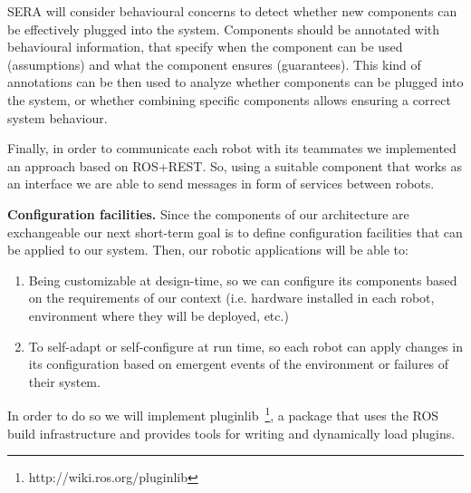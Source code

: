 SERA will consider behavioural concerns to detect whether new components can be effectively plugged into the system. 
Components should be annotated with behavioural information, that specify when the component can be used (assumptions) and what the component ensures (guarantees). 
This kind of annotations can be then used to analyze whether components can be plugged into the system, or whether combining specific components allows ensuring a correct system behaviour. 

Finally, in order to communicate each robot with its teammates we implemented an approach based on ROS+REST.
So, using a suitable component that works as an interface we are able to send messages in form of services between robots.

\textbf{Configuration facilities.}
Since the components of our architecture are exchangeable our next short-term goal is to define configuration facilities that can be applied to our system. %
Then, our robotic applications will be able to:

\begin{enumerate}
\item Being customizable at design-time, so we can configure its components based on the requirements of our context (i.e. hardware installed in each robot, environment where they will be deployed, etc.)
\item To self-adapt or self-configure at run time, so each robot can apply changes in its configuration based on emergent events of the environment or failures of their system.
\end{enumerate}

In order to do so we will implement pluginlib~\footnote{http://wiki.ros.org/pluginlib}, a package that uses the ROS build infrastructure and provides tools for writing and dynamically load plugins.



